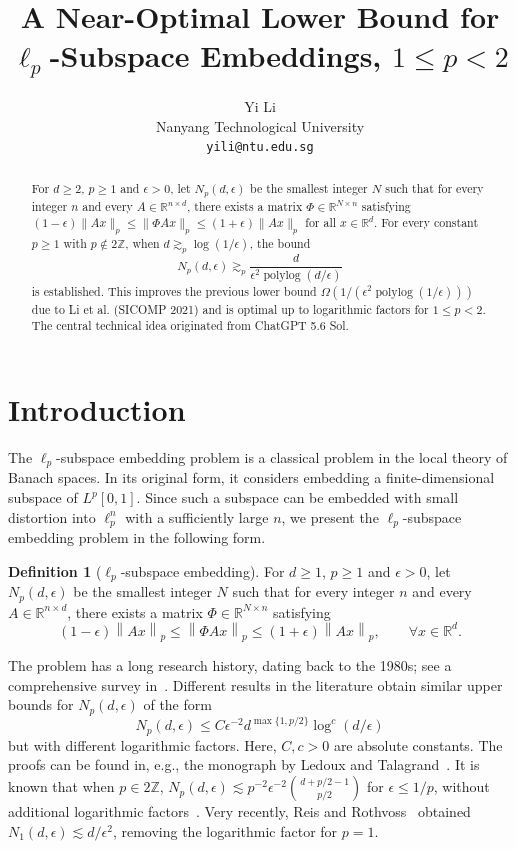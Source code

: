 \documentclass[11pt]{article}
\title{A Near-Optimal Lower Bound for $\ell_p$-Subspace Embeddings, $1\leq p<2$}
\author{Yi Li \\ Nanyang Technological University \\ \texttt{yili@ntu.edu.sg}}
\date{}
\theoremstyle{remark}
\theoremstyle{definition}
\newtheorem{definition}{Definition}
\newcommand{\R}{\mathbb{R}}
\newcommand{\Z}{\mathbb{Z}}
\newcommand{\eps}{\epsilon}
\newcommand{\norm}[1]{\left\|#1\right\|}
\begin{document}
\maketitle

\begin{abstract}
	For $d \geq 2$, $p \geq 1$ and $\epsilon > 0$, let $N_p(d,\epsilon)$ be the smallest integer $N$ such that for every integer $n$ and every $A\in\mathbb{R}^{n\times d}$, there exists a matrix $\Phi\in\mathbb{R}^{N\times n}$ satisfying
	$(1-\epsilon)\lVert Ax\rVert_p\leq \lVert\Phi A x\rVert_p\leq (1+\epsilon)\lVert Ax\rVert_p$ for all $x\in\mathbb{R}^d$.
	For every constant $p\geq 1$ with $p\not\in 2\mathbb{Z}$, when $d\gtrsim_p \log(1/\epsilon)$, the bound
	\[
		N_p(d,\epsilon) \gtrsim_{p} \frac{d}{\epsilon^2 \operatorname{polylog}(d/\epsilon)}
	\]
	is established. This improves the previous lower bound $\Omega(1/(\epsilon^2\operatorname{polylog}(1/\epsilon)))$ due to Li et al. (SICOMP 2021) and is optimal up to logarithmic factors for $1\leq p<2$.  The central technical idea originated from ChatGPT 5.6 Sol.
\end{abstract}

\section{Introduction}

The $\ell_p$-subspace embedding problem is a classical problem in the local theory of Banach spaces. In its original form, it considers embedding a finite-dimensional subspace of $L^p[0,1]$. Since such a subspace can be embedded with small distortion into $\ell_p^n$ with a sufficiently large $n$, we present the $\ell_p$-subspace embedding problem in the following form.

\begin{definition}[$\ell_p$-subspace embedding]
	For $d\geq 1$, $p\geq 1$ and $\eps>0$, let $N_p(d,\eps)$ be the smallest integer $N$ such that for every integer $n$ and every $A\in\R^{n\times d}$, there exists a matrix $\Phi \in \R^{N\times n}$ satisfying
	\[
		(1-\epsilon)\norm{Ax}_{p}\leq \norm{\Phi A x}_p \leq (1+\eps)\norm{Ax}_p,	\qquad \forall x\in \R^d.
	\]
\end{definition}

The problem has a long research history, dating back to the 1980s; see a comprehensive survey in~\cite{handbook:19}. Different results in the literature obtain similar upper bounds for $N_p(d,\eps)$ of the form
\begin{equation}\label{eqn:N_p(d,eps)}
	N_p(d,\eps) \leq C \eps^{-2}d^{\max\{1, p/2\}}\log^c (d/\eps)
\end{equation}
but with different logarithmic factors. Here, $C,c > 0$ are absolute constants. The proofs can be found in, e.g., the monograph by Ledoux and Talagrand~\cite{LT91}. It is known that when $p\in 2\Z$, $N_p(d,\eps) \lesssim p^{-2}\eps^{-2}\binom{d+p/2-1}{p/2}$ for $\eps\leq 1/p$, without additional logarithmic factors~\cite{schechtman:tight}. Very recently, Reis and Rothvoss~\cite{RR26} obtained $N_1(d,\eps) \lesssim d/\eps^2$, removing the logarithmic factor for $p = 1$.
\end{document}
